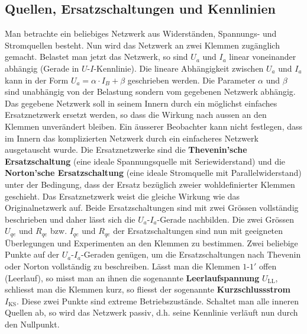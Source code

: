 \subsection{Quellen, Ersatzschaltungen und Kennlinien}
Man betrachte ein beliebiges Netzwerk aus Widerständen, Spannungs- und Stromquellen besteht. Nun wird das Netzwerk an zwei Klemmen zugänglich gemacht. Belastet man jetzt das Netzwerk, so sind $U_a$ und $I_a$ linear voneinander abhängig (Gerade in $U$-$I$-Kennlinie).
\newline\newline
Die lineare Abhängigkeit zwischen $U_a$ und $I_a$ kann in der Form $U_a=\alpha\cdot I_B+\beta$ geschrieben werden. Die Parameter $\alpha$ und $\beta$ sind unabhängig von der Belastung sondern vom gegebenen Netzwerk abhängig.
\newline\newline
Das gegebene Netzwerk soll in seinem Innern durch ein möglichst einfaches Ersatznetzwerk ersetzt werden, so dass die Wirkung nach aussen an den Klemmen unverändert bleiben. Ein äusserer Beobachter kann nicht festlegen, dass im Innern das komplizierten Netzwerk durch ein einfacheres Netzwerk ausgetauscht wurde.
\newline\newline
Die Ersatznetzwerke sind die \textbf{Thevenin'sche Ersatzschaltung} (eine ideale Spannungsquelle mit Seriewiderstand) und die \textbf{Norton'sche Ersatzschaltung} (eine ideale Stromquelle mit Parallelwiderstand) unter der Bedingung, dass der Ersatz bezüglich zweier wohldefinierter Klemmen geschieht. Das Ersatznetzwerk weist die gleiche Wirkung wie das Originalnetzwerk auf. Beide Ersatzschaltungen sind mit zwei Grössen vollständig beschrieben und daher lässt sich die $U_a$-$I_a$-Gerade nachbilden.
\newline\newline
Die zwei Grössen $U_{qe}$ und $R_{qe}$ bzw. $I_{qe}$ und $R_{qe}$ der Ersatzschaltungen sind nun mit geeigneten Überlegungen und Experimenten an den Klemmen zu bestimmen.
\newline\newline
Zwei beliebige Punkte auf der $U_a$-$I_a$-Geraden genügen, um die Ersatzschaltungen nach Thevenin oder Norton vollständig zu beschreiben. Lässt man die Klemmen $1$-$1'$ offen (Leerlauf), so misst man an ihnen die sogenannte \textbf{Leerlaufspannung} $U_{\text{LL}}$, schliesst man die Klemmen kurz, so fliesst der sogenannte \textbf{Kurzschlussstrom} $I_{\text{KS}}$. Diese zwei Punkte sind extreme Betriebszustände. Schaltet man alle inneren Quellen ab, so wird das Netzwerk passiv, d.h. seine Kennlinie verläuft nun durch den Nullpunkt.
